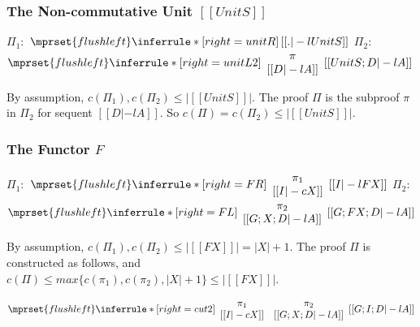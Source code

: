 \subsubsection{The Non-commutative Unit $[[UnitS]]$}
\begin{center}
  \scriptsize
  $\Pi_1:$
  \begin{math}
    $$\mprset{flushleft}
    \inferrule* [right={\tiny unitR}] {
      \,
    }{[[. |-l UnitS]]}
  \end{math}
  \qquad\qquad
  $\Pi_2:$
  \begin{math}
    $$\mprset{flushleft}
    \inferrule* [right={\tiny unitL2}] {
      {
        \begin{array}{c}
          \pi \\
          {[[D |-l A]]}
        \end{array}
      }
    }{[[UnitS; D |-l A]]}
  \end{math}
\end{center}
By assumption, $c(\Pi_1),c(\Pi_2)\leq |[[UnitS]]|$. The proof $\Pi$
is the subproof $\pi$ in $\Pi_2$ for sequent $[[D |-l A]]$. So
$c(\Pi)=c(\Pi_2)\leq |[[UnitS]]|$.

\subsubsection{The Functor $F$}
\begin{center}
  \scriptsize
  $\Pi_1:$
  \begin{math}
    $$\mprset{flushleft}
    \inferrule* [right={\tiny FR}] {
      {
        \begin{array}{c}
          \pi_1 \\
          {[[I |-c X]]}
        \end{array}
      }
    }{[[I |-l F X]]}
  \end{math}
  \qquad\qquad
  $\Pi_2:$
  \begin{math}
    $$\mprset{flushleft}
    \inferrule* [right={\tiny FL}] {
      {
        \begin{array}{c}
          \pi_2 \\
          {[[G; X; D |-l A]]}
        \end{array}
      }
    }{[[G; F X; D |-l A]]}
  \end{math}
\end{center}
By assumption, $c(\Pi_1),c(\Pi_2)\leq |[[F X]]| = |X|+1$. The proof
$\Pi$ is constructed as follows, and \\
$c(\Pi)\leq max\{c(\pi_1),c(\pi_2),|X|+1\}\leq |[[F X]]|$.
\begin{center}
  \scriptsize
  \begin{math}
    $$\mprset{flushleft}
    \inferrule* [right={\tiny cut2}] {
      {
        \begin{array}{cc}
          \pi_1 & \pi_2 \\
          {[[I |-c X]]} & {[[G; X; D |-l A]]}
        \end{array}
      }
    }{[[G; I; D |-l A]]}
  \end{math}
\end{center}

